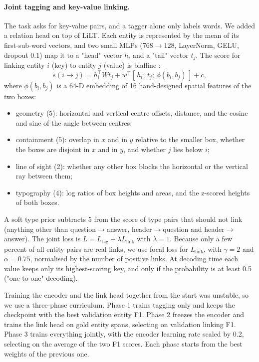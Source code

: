 \documentclass[11pt,a4paper]{article}
\begin{document}
\paragraph{Joint tagging and key-value linking.} The task asks for key-value pairs, and a tagger alone only labels words. We added a relation head on top of LiLT. Each entity is represented by the mean of its first-sub-word vectors, and two small MLPs ($768 \to 128$, LayerNorm, GELU, dropout 0.1) map it to a "head" vector $h_i$ and a "tail" vector $t_j$. The score for linking entity $i$ (key) to entity $j$ (value) is biaffine \cite{biaffine}:
\begin{equation}
s(i \to j) = h_i^\top W t_j + w^\top [\,h_i;\, t_j;\, \phi(b_i, b_j)\,] + c,
\end{equation}
where $\phi(b_i,b_j)$ is a 64-D embedding of 16 hand-designed spatial features of the two boxes:
\begin{itemize}
  \item geometry (5): horizontal and vertical centre offsets, distance, and the cosine and sine of the angle between centres;
  \item containment (5): overlap in $x$ and in $y$ relative to the smaller box, whether the boxes are disjoint in $x$ and in $y$, and whether $j$ lies below $i$;
  \item line of sight (2): whether any other box blocks the horizontal or the vertical ray between them;
  \item typography (4): log ratios of box heights and areas, and the z-scored heights of both boxes.
\end{itemize}
A soft type prior subtracts 5 from the score of type pairs that should not link (anything other than question$\to$answer, header$\to$question and header$\to$answer). The joint loss is $L = L_{\text{tag}} + \lambda L_{\text{link}}$ with $\lambda = 1$. Because only a few percent of all entity pairs are real links, we use focal loss \cite{focal} for $L_{\text{link}}$, with $\gamma = 2$ and $\alpha = 0.75$, normalised by the number of positive links. At decoding time each value keeps only its highest-scoring key, and only if the probability is at least 0.5 ("one-to-one" decoding).

Training the encoder and the link head together from the start was unstable, so we use a three-phase curriculum. Phase 1 trains tagging only and keeps the checkpoint with the best validation entity F1. Phase 2 freezes the encoder and trains the link head on gold entity spans, selecting on validation linking F1. Phase 3 trains everything jointly, with the encoder learning rate scaled by 0.2, selecting on the average of the two F1 scores. Each phase starts from the best weights of the previous one.
\end{document}
